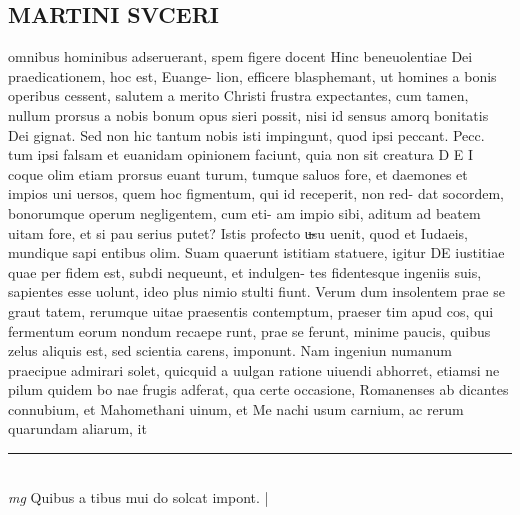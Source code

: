 \documentclass{article}
\begin{document}
\begin{pages}
\section*{MARTINI SVCERI }\pstart omnibus hominibus adseruerant, spem figere docent Hinc beneuolentiae Dei praedicationem, hoc est, Euange- lion, efficere blasphemant, ut homines a bonis operibus cessent, salutem a merito Christi frustra expectantes, cum tamen, nullum prorsus a nobis bonum opus sieri possit, nisi id sensus amorq bonitatis Dei gignat. Sed non hic tantum nobis isti impingunt, quod ipsi peccant.  Pecc. tum ipsi falsam et euanidam opinionem faciunt, quia non sit creatura D E I coque olim etiam prorsus euant turum, tumque saluos fore, et daemones et impios uni uersos, quem hoc figmentum, qui id receperit, non red- dat socordem, bonorumque operum negligentem, cum eti- am impio sibi, aditum ad beatem uitam fore, et si pau serius putet?  \pend\pstart Istis profecto u̶su uenit, quod et Iudaeis, mundique sapi entibus olim. Suam quaerunt istitiam statuere, igitur DE iustitiae quae per fidem est, subdi nequeunt, et indulgen- tes fidentesque ingeniis suis, sapientes esse uolunt, ideo plus nimio stulti fiunt. Verum dum insolentem prae se graut tatem, rerumque uitae praesentis contemptum, praeser tim apud cos, qui fermentum eorum nondum recaepe runt, prae se ferunt, minime paucis, quibus zelus aliquis est, sed scientia carens, imponunt. Nam ingeniun numanum praecipue admirari solet, quicquid a uulgan ratione uiuendi abhorret, etiamsi ne pilum quidem bo nae frugis adferat, qua certe occasione, Romanenses ab dicantes connubium, et Mahomethani uinum, et Me nachi usum carnium, ac rerum quarundam aliarum, it  \pend
\vspace{0.5cm}\noindent
\vspace{0.2cm}\rule{1cm}{0.2pt}\\ 
\hspace{0.2cm}\textit{mg}
\footnotesize Quibus   a tibus mui do solcat impont.  
\normalsize| 

\end{pages}
\end{document}
